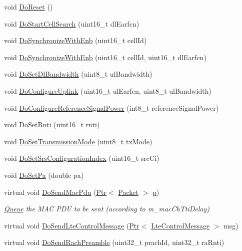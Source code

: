 \begin{DoxyCompactItemize}
\item 
void \hyperlink{classns3_1_1LteUePhy_a59ebd3724b9823c6c724e31b0ebbe9b1}{Do\+Reset} ()
\item 
void \hyperlink{classns3_1_1LteUePhy_adc8c51bfadf1311a169581c1877bfd6b}{Do\+Start\+Cell\+Search} (uint16\+\_\+t dl\+Earfcn)
\item 
void \hyperlink{classns3_1_1LteUePhy_a73eff1d7da65749d46e20c64fd7ebfa8}{Do\+Synchronize\+With\+Enb} (uint16\+\_\+t cell\+Id)
\item 
void \hyperlink{classns3_1_1LteUePhy_a2ac05c2a5a5a71783296e7f0ce1deae6}{Do\+Synchronize\+With\+Enb} (uint16\+\_\+t cell\+Id, uint16\+\_\+t dl\+Earfcn)
\item 
void \hyperlink{classns3_1_1LteUePhy_ab545da883246fab44f678ed01c0ff2b5}{Do\+Set\+Dl\+Bandwidth} (uint8\+\_\+t ul\+Bandwidth)
\item 
void \hyperlink{classns3_1_1LteUePhy_aba461671d35fa0a1a47871e44a824267}{Do\+Configure\+Uplink} (uint16\+\_\+t ul\+Earfcn, uint8\+\_\+t ul\+Bandwidth)
\item 
void \hyperlink{classns3_1_1LteUePhy_a656cde41dffde397ae30f8eae8cfe603}{Do\+Configure\+Reference\+Signal\+Power} (int8\+\_\+t reference\+Signal\+Power)
\item 
void \hyperlink{classns3_1_1LteUePhy_ad4882e155e3c040bd78ff11c279e0fa7}{Do\+Set\+Rnti} (uint16\+\_\+t rnti)
\item 
void \hyperlink{classns3_1_1LteUePhy_a8cbb804aa92355087ef55c8b6ac1c7a2}{Do\+Set\+Transmission\+Mode} (uint8\+\_\+t tx\+Mode)
\item 
void \hyperlink{classns3_1_1LteUePhy_a7558c16cee39e95a7b508622dee8fdc3}{Do\+Set\+Srs\+Configuration\+Index} (uint16\+\_\+t src\+Ci)
\item 
void \hyperlink{classns3_1_1LteUePhy_aae4416c47836789803ee8161323735ca}{Do\+Set\+Pa} (double pa)
\item 
virtual void \hyperlink{classns3_1_1LteUePhy_ad9e4722d7ac9c0944a010ed788568500}{Do\+Send\+Mac\+Pdu} (\hyperlink{classns3_1_1Ptr}{Ptr}$<$ \hyperlink{classns3_1_1Packet}{Packet} $>$ \hyperlink{lte__link__budget__x2__handover__measures_8m_ac9de518908a968428863f829398a4e62}{p})
\begin{DoxyCompactList}\small\item\em \hyperlink{classns3_1_1Queue}{Queue} the M\+AC P\+DU to be sent (according to m\+\_\+mac\+Ch\+Tti\+Delay) \end{DoxyCompactList}\item 
virtual void \hyperlink{classns3_1_1LteUePhy_aec15b282a5036f328c1e8ca6222b6b13}{Do\+Send\+Lte\+Control\+Message} (\hyperlink{classns3_1_1Ptr}{Ptr}$<$ \hyperlink{classns3_1_1LteControlMessage}{Lte\+Control\+Message} $>$ msg)
\item 
virtual void \hyperlink{classns3_1_1LteUePhy_a560e551a1dab098d404ec7e125b77a38}{Do\+Send\+Rach\+Preamble} (uint32\+\_\+t prach\+Id, uint32\+\_\+t ra\+Rnti)
\end{DoxyCompactItemize}
